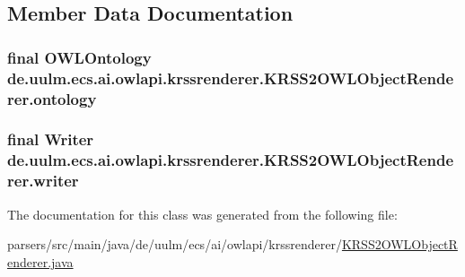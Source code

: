\subsection{Member Data Documentation}
\hypertarget{classde_1_1uulm_1_1ecs_1_1ai_1_1owlapi_1_1krssrenderer_1_1_k_r_s_s2_o_w_l_object_renderer_a0e42c03d05c433e1fc5c20517f9ade5a}{
\subsubsection[{ontology}]{\setlength{\rightskip}{0pt plus 5cm}final {\bf O\-W\-L\-Ontology} de.\-uulm.\-ecs.\-ai.\-owlapi.\-krssrenderer.\-K\-R\-S\-S2\-O\-W\-L\-Object\-Renderer.\-ontology\hspace{0.3cm}{\ttfamily [private]}}}\label{classde_1_1uulm_1_1ecs_1_1ai_1_1owlapi_1_1krssrenderer_1_1_k_r_s_s2_o_w_l_object_renderer_a0e42c03d05c433e1fc5c20517f9ade5a}
\hypertarget{classde_1_1uulm_1_1ecs_1_1ai_1_1owlapi_1_1krssrenderer_1_1_k_r_s_s2_o_w_l_object_renderer_ad323dee15e89bfcb425d67a39bf074b9}{
\subsubsection[{writer}]{\setlength{\rightskip}{0pt plus 5cm}final Writer de.\-uulm.\-ecs.\-ai.\-owlapi.\-krssrenderer.\-K\-R\-S\-S2\-O\-W\-L\-Object\-Renderer.\-writer\hspace{0.3cm}{\ttfamily [private]}}}\label{classde_1_1uulm_1_1ecs_1_1ai_1_1owlapi_1_1krssrenderer_1_1_k_r_s_s2_o_w_l_object_renderer_ad323dee15e89bfcb425d67a39bf074b9}


The documentation for this class was generated from the following file\-:\begin{DoxyCompactItemize}
\item 
parsers/src/main/java/de/uulm/ecs/ai/owlapi/krssrenderer/\hyperlink{_k_r_s_s2_o_w_l_object_renderer_8java}{K\-R\-S\-S2\-O\-W\-L\-Object\-Renderer.\-java}\end{DoxyCompactItemize}
